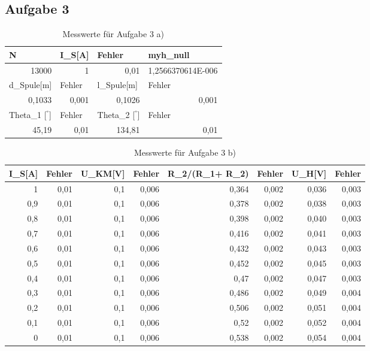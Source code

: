 \documentclass[12pt]{scrartcl}
\begin{document}
\subsection{Aufgabe 3}
\begin{table}[htbp]
\caption{Messwerte für Aufgabe 3 a)}
\begin{center}
\begin{tabular}{|l|l|l|l|}
\hline
N & I\_S[A] & Fehler & myh\_null \\ \hline
\multicolumn{1}{|r|}{13000} & \multicolumn{1}{r|}{1} & \multicolumn{1}{r|}{0,01} & \multicolumn{1}{r|}{1,2566370614E-006} \\ \hline
d\_Spule[m] & Fehler & l\_Spule[m] & Fehler \\ \hline
\multicolumn{1}{|r|}{0,1033} & \multicolumn{1}{r|}{0,001} & \multicolumn{1}{r|}{0,1026} & \multicolumn{1}{r|}{0,001} \\ \hline
Theta\_1 [$^°$] & Fehler & Theta\_2 [$^°$]& Fehler \\ \hline
\multicolumn{1}{|r|}{45,19} & \multicolumn{1}{r|}{0,01} & \multicolumn{1}{r|}{134,81} & \multicolumn{1}{r|}{0,01} \\ \hline
\end{tabular}
\end{center}
\label{aufgabe_3_a}
\end{table}

\begin{table}[htbp]
\caption{Messwerte für Aufgabe 3 b)}
\begin{center}
\begin{tabular}{|r|r|r|r|r|r|r|r|}
\hline
\multicolumn{1}{|l|}{I\_S[A]} & \multicolumn{1}{l|}{Fehler} & \multicolumn{1}{l|}{U\_KM[V]} & \multicolumn{1}{l|}{Fehler} & \multicolumn{1}{l|}{R\_2/(R\_1+ R\_2)} & \multicolumn{1}{l|}{Fehler} & \multicolumn{1}{l|}{U\_H[V]} & \multicolumn{1}{l|}{Fehler} \\ \hline
1 & 0,01 & 0,1 & 0,006 & 0,364 & 0,002 & 0,036 & 0,003 \\ \hline
0,9 & 0,01 & 0,1 & 0,006 & 0,378 & 0,002 & 0,038 & 0,003 \\ \hline
0,8 & 0,01 & 0,1 & 0,006 & 0,398 & 0,002 & 0,040 & 0,003 \\ \hline
0,7 & 0,01 & 0,1 & 0,006 & 0,416 & 0,002 & 0,041 & 0,003 \\ \hline
0,6 & 0,01 & 0,1 & 0,006 & 0,432 & 0,002 & 0,043 & 0,003 \\ \hline
0,5 & 0,01 & 0,1 & 0,006 & 0,452 & 0,002 & 0,045 & 0,003 \\ \hline
0,4 & 0,01 & 0,1 & 0,006 & 0,47 & 0,002 & 0,047 & 0,003 \\ \hline
0,3 & 0,01 & 0,1 & 0,006 & 0,486 & 0,002 & 0,049 & 0,004 \\ \hline
0,2 & 0,01 & 0,1 & 0,006 & 0,506 & 0,002 & 0,051 & 0,004 \\ \hline
0,1 & 0,01 & 0,1 & 0,006 & 0,52 & 0,002 & 0,052 & 0,004 \\ \hline
0 & 0,01 & 0,1 & 0,006 & 0,538 & 0,002 & 0,054 & 0,004 \\ \hline
\end{tabular}
\end{center}
\label{aufgabe_3_b}
\end{table}
\end{document}
